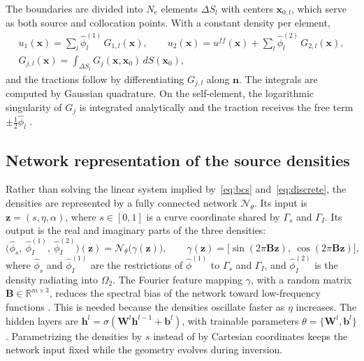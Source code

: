 The boundaries are divided into $N_e$ elements $\Delta S_l$ with centers
$\mathbf{x}_{0,l}$, which serve as both source and collocation points. With a
constant density per element,
\begin{equation}\label{eq:discrete}
  \begin{gathered}
  u_1(\mathbf{x}) = \sum_{l} \hat\phi^{(1)}_l\, G_{1,l}(\mathbf{x}),\qquad
  u_2(\mathbf{x}) = u^{f\!f}(\mathbf{x}) + \sum_{l} \hat\phi^{(2)}_l\, G_{2,l}(\mathbf{x}),\\
  G_{j,l}(\mathbf{x}) = \int_{\Delta S_l} G_j(\mathbf{x},\mathbf{x}_0)\, dS(\mathbf{x}_0),
  \end{gathered}
\end{equation}
and the tractions follow by differentiating $G_{j,l}$ along $\mathbf{n}$. The
integrals are computed by Gaussian quadrature. On the self-element, the
logarithmic singularity of $G_j$ is integrated analytically and the traction
receives the free term $\pm\tfrac12\hat\phi_l$ \citep{SanchezSesma1991}.

\subsection{Network representation of the source densities}

Rather than solving the linear system implied by~\eqref{eq:bcs}
and~\eqref{eq:discrete}, the densities are represented by a fully connected
network $\mathcal{N}_\theta$. Its input is $\mathbf{z} = (s,\eta,\alpha)$, where
$s\in[0,1]$ is a curve coordinate shared by $\Gamma_s$ and $\Gamma_I$. Its
output is the real and imaginary parts of the three densities:
\begin{equation}
  \bigl(\hat\phi_s,\ \hat\phi_I^{(1)},\ \hat\phi_I^{(2)}\bigr)(\mathbf{z})
  = \mathcal{N}_\theta\bigl(\gamma(\mathbf{z})\bigr),
  \qquad
  \gamma(\mathbf{z}) = \bigl[\sin(2\pi\mathbf{B}\mathbf{z}),\ \cos(2\pi\mathbf{B}\mathbf{z})\bigr],
\end{equation}
where $\hat\phi_s$ and $\hat\phi_I^{(1)}$ are the restrictions of
$\hat\phi^{(1)}$ to $\Gamma_s$ and $\Gamma_I$, and $\hat\phi_I^{(2)}$ is the
density radiating into $\Omega_2$. The Fourier feature mapping $\gamma$, with a
random matrix $\mathbf{B}\in\mathbb{R}^{m\times 3}$, reduces the spectral bias
of the network toward low-frequency functions \citep{Tancik2020}. This is needed
because the densities oscillate faster as $\eta$ increases. The hidden layers
are $\mathbf{h}^l = \sigma(\mathbf{W}^l\mathbf{h}^{l-1} + \mathbf{b}^l)$, with
trainable parameters $\theta = \{\mathbf{W}^l,\mathbf{b}^l\}$. Parametrizing the
densities by $s$ instead of by Cartesian coordinates keeps the network input
fixed while the geometry evolves during inversion.

